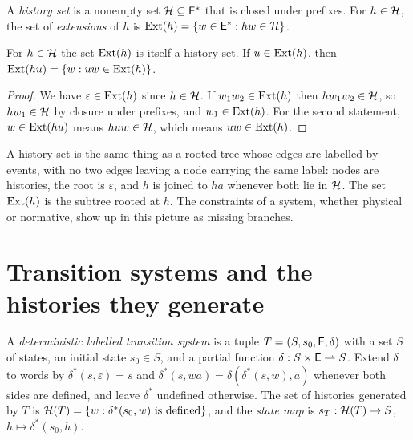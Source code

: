 \begin{definition}\label{def:history-set}
A \emph{history set} is a nonempty set $\mathcal{H}\subseteq\mathsf{E}^{*}$ that is closed under prefixes. For $h\in\mathcal{H}$, the set of \emph{extensions} of $h$ is $\operatorname{Ext}(h)=\{w\in\mathsf{E}^{*}: hw\in\mathcal{H}\}$.
\end{definition}

\begin{established}[Extensions]\label{prop:extensions}
For $h\in\mathcal{H}$ the set $\operatorname{Ext}(h)$ is itself a history set. If $u\in\operatorname{Ext}(h)$, then $\operatorname{Ext}(hu)=\{w : uw\in\operatorname{Ext}(h)\}$.
\end{established}
\begin{proof}
We have $\varepsilon\in\operatorname{Ext}(h)$ since $h\in\mathcal{H}$. If $w_1w_2\in\operatorname{Ext}(h)$ then $hw_1w_2\in\mathcal{H}$, so $hw_1\in\mathcal{H}$ by closure under prefixes, and $w_1\in\operatorname{Ext}(h)$. For the second statement, $w\in\operatorname{Ext}(hu)$ means $huw\in\mathcal{H}$, which means $uw\in\operatorname{Ext}(h)$.
\end{proof}

A history set is the same thing as a rooted tree whose edges are labelled by events, with no two edges leaving a node carrying the same label: nodes are histories, the root is $\varepsilon$, and $h$ is joined to $ha$ whenever both lie in $\mathcal{H}$. The set $\operatorname{Ext}(h)$ is the subtree rooted at $h$. The constraints of a system, whether physical or normative, show up in this picture as missing branches.

\section{Transition systems and the histories they generate}

\begin{definition}\label{def:lts}
A \emph{deterministic labelled transition system} is a tuple $T=(S,s_0,\mathsf{E},\delta)$ with a set $S$ of states, an initial state $s_0\in S$, and a partial function $\delta:S\times\mathsf{E}\rightharpoonup S$. Extend $\delta$ to words by $\delta^{*}(s,\varepsilon)=s$ and $\delta^{*}(s,wa)=\delta(\delta^{*}(s,w),a)$ whenever both sides are defined, and leave $\delta^{*}$ undefined otherwise. The set of histories generated by $T$ is $\mathcal{H}(T)=\{w: \delta^{*}(s_0,w)\text{ is defined}\}$, and the \emph{state map} is $s_T:\mathcal{H}(T)\to S$, $h\mapsto\delta^{*}(s_0,h)$.
\end{definition}

